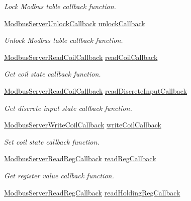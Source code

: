 \begin{DoxyCompactItemize}
\begin{DoxyCompactList}\small\item\em Lock Modbus table callback function. \end{DoxyCompactList}\item 
\hyperlink{modbus__server_8h_ac238025fdae42e739fef8f16b2507444}{Modbus\+Server\+Unlock\+Callback} \hyperlink{structModbusServerSettings_ae3ae55909a636d05e82be40b638797ac}{unlock\+Callback}
\begin{DoxyCompactList}\small\item\em Unlock Modbus table callback function. \end{DoxyCompactList}\item 
\hyperlink{modbus__server_8h_a163e3ddadc2ead9869a527e3c2fe1d02}{Modbus\+Server\+Read\+Coil\+Callback} \hyperlink{structModbusServerSettings_a5447c4373d3859174ebc5cf30d355ff4}{read\+Coil\+Callback}
\begin{DoxyCompactList}\small\item\em Get coil state callback function. \end{DoxyCompactList}\item 
\hyperlink{modbus__server_8h_a163e3ddadc2ead9869a527e3c2fe1d02}{Modbus\+Server\+Read\+Coil\+Callback} \hyperlink{structModbusServerSettings_a559d5de77d56d25a06e2bc04c72e08fd}{read\+Discrete\+Input\+Callback}
\begin{DoxyCompactList}\small\item\em Get discrete input state callback function. \end{DoxyCompactList}\item 
\hyperlink{modbus__server_8h_a2116bb4e6258e6e41dd97272d1211cfd}{Modbus\+Server\+Write\+Coil\+Callback} \hyperlink{structModbusServerSettings_a387f80bcdb0b1140d3f3e46b308be59d}{write\+Coil\+Callback}
\begin{DoxyCompactList}\small\item\em Set coil state callback function. \end{DoxyCompactList}\item 
\hyperlink{modbus__server_8h_a3d9a52f0b248469bb1e36927cdb5ce91}{Modbus\+Server\+Read\+Reg\+Callback} \hyperlink{structModbusServerSettings_aaa25139042e2337576526848e05a4a5d}{read\+Reg\+Callback}
\begin{DoxyCompactList}\small\item\em Get register value callback function. \end{DoxyCompactList}\item 
\hyperlink{modbus__server_8h_a3d9a52f0b248469bb1e36927cdb5ce91}{Modbus\+Server\+Read\+Reg\+Callback} \hyperlink{structModbusServerSettings_a859712883e372e00b39a4ac270a402bf}{read\+Holding\+Reg\+Callback}

\end{DoxyCompactItemize}

